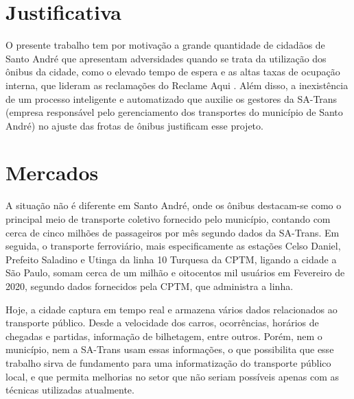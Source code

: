 \section{Justificativa}
\indent
\par O presente trabalho tem por motivação a grande quantidade de cidadãos de Santo André que apresentam adversidades quando se trata da utilização dos ônibus da cidade, como o elevado tempo de espera e as altas taxas de ocupação interna, que lideram as reclamações do Reclame Aqui \cite{ReclameAqui1} \cite{ReclameAqui2}. Além disso, a inexistência de um processo inteligente e automatizado que auxilie os gestores da SA-Trans (empresa responsável pelo gerenciamento dos transportes do município de Santo André) no ajuste das frotas de ônibus justificam esse projeto.

\section{Mercados}
\indent
\begin{comment}
\par A situação não é diferente em Santo André, onde os ônibus destacam-se como o principal meio de transporte coletivo fornecido pelo município, contando com cerca de cinco milhões de passageiros por mês segundo dados da SA-Trans. Em seguida, o transporte ferroviário, mais especificamente as estações Celso Daniel, Prefeito Saladino e Utinga da linha 10 Turquesa da CPTM, ligando a cidade a São Paulo, garantem o segundo lugar no ranking, somando cerca de um milhão e oitocentos mil usuários em Fevereiro de 2020, segundo dados fornecidos pela CPTM, que administra a linha.
\end{comment}
\par A situação não é diferente em Santo André, onde os ônibus destacam-se como o principal meio de transporte coletivo fornecido pelo município, contando com cerca de cinco milhões de passageiros por mês segundo dados da SA-Trans. Em seguida, o transporte ferroviário, mais especificamente as estações Celso Daniel, Prefeito Saladino e Utinga da linha 10 Turquesa da CPTM, ligando a cidade a São Paulo, somam cerca de um milhão e oitocentos mil usuários em Fevereiro de 2020, segundo dados fornecidos pela CPTM, que administra a linha.
\par Hoje, a cidade captura em tempo real e armazena vários dados relacionados ao transporte público. Desde a velocidade dos carros, ocorrências, horários de chegadas e partidas, informação de bilhetagem, entre outros. Porém, nem o município, nem a SA-Trans usam essas informações, o que possibilita que esse trabalho sirva de fundamento para uma informatização do transporte público local, e que permita melhorias no setor que não seriam possíveis apenas com as técnicas utilizadas atualmente.

